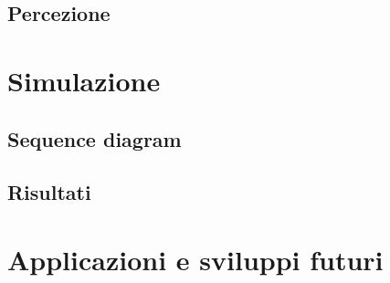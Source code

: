 \documentclass[14pt,a4paper]{extarticle}
\begin{document}

\subsection{Percezione}

\section{Simulazione}

\subsection{Sequence diagram}

\subsection{Risultati}

\section{Applicazioni e sviluppi futuri}

\newpage

%
%

%
\end{document}
